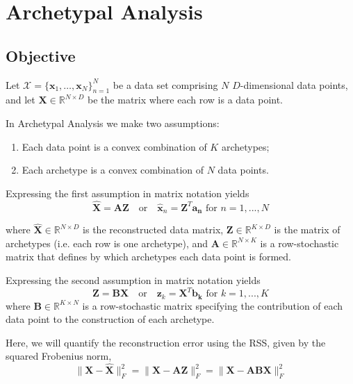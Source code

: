 \documentclass[oneside]{article}
\begin{document}
\clearpage

\section{Archetypal Analysis}

\subsection{Objective}

Let $\mathcal{X}=\{\mathbf{x}_1, \ldots, \mathbf{x}_N\}_{n=1}^N$ be a data set comprising $N$ $D$-dimensional data points, and let $\mathbf{X} \in \mathbb{R}^{N \times D}$ be the matrix where each row is a data point.

In Archetypal Analysis we make two assumptions:

\begin{enumerate}
    \item Each data point is a convex combination of $K$ archetypes;
    \item Each archetype is a convex combination of $N$ data points.
\end{enumerate}

Expressing the first assumption in matrix notation yields
\begin{equation}
\label{eq:first-assumption}
\hat{\mathbf{X}} = \mathbf{A} \mathbf{Z} \quad \text{or} \quad \hat{\mathbf{x}}_n = \mathbf{Z}^T \mathbf{a_n} \text{ for } n = 1, ..., N
\end{equation}

where $\hat{\mathbf{X}} \in \mathbb{R}^{N \times D}$ is the reconstructed data matrix, $\mathbf{Z} \in \mathbb{R}^{K \times D}$ is the matrix of archetypes (i.e. each row is one archetype), and $\mathbf{A} \in \mathbb{R}^{N \times K}$ is a row-stochastic matrix that defines by which archetypes each data point is formed.

Expressing the second assumption in matrix notation yields\begin{equation}
\label{eq:second-assumption}
\mathbf{Z} = \mathbf{B} \mathbf{X} \quad \text{or} \quad \mathbf{z}_k = \mathbf{X}^T \mathbf{b_k} \text{ for } k = 1, ..., K
\end{equation}
where $\mathbf{B} \in \mathbb{R}^{K \times N}$ is a row-stochastic matrix specifying the contribution of each data point to the construction of each archetype.

Here, we will quantify the reconstruction error  using the RSS, given by the squared Frobenius norm,
\begin{equation}
\label{eq:rss}
\| \mathbf{X} - \hat{\mathbf{X}} \|_F^2 = \| \mathbf{X} - \mathbf{A} \mathbf{Z} \|_F^2 =  \| \mathbf{X} -  \mathbf{A} \mathbf{B} \mathbf{X} \|_F^2
\end{equation}
\end{document}
